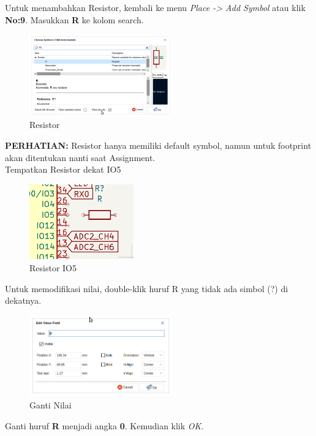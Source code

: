 \documentclass[12pt]{book}
\begin{document}
	Untuk menambahkan Resistor, kembali ke menu \textit{Place -> Add Symbol} atau klik \textbf{No:9}.
	Masukkan \textbf{R} ke kolom search.

	\begin{figure}[!ht]
		\centering
		\includegraphics[width=0.55\textwidth]{images/sch/sch_9}
		\caption{Resistor}
	\end{figure}

	\textbf{PERHATIAN:} Resistor hanya memiliki default symbol, namun untuk footprint akan
	ditentukan nanti saat Assignment.\\

	Tempatkan Resistor dekat IO5
	\begin{figure}[!ht]
		\centering
		\includegraphics[width=0.4\textwidth]{images/sch/sch_10}
		\caption{Resistor IO5}
	\end{figure}

	Untuk memodifikasi nilai, double-klik huruf R yang tidak ada simbol (?) di dekatnya.
	\begin{figure}[!ht]
		\centering
		\includegraphics[width=0.55\textwidth]{images/sch/sch_11}
		\caption{Ganti Nilai}
	\end{figure}

	Ganti huruf \textbf{R} menjadi angka \textbf{0}. Kemudian klik \textit{OK}.
\end{document}
